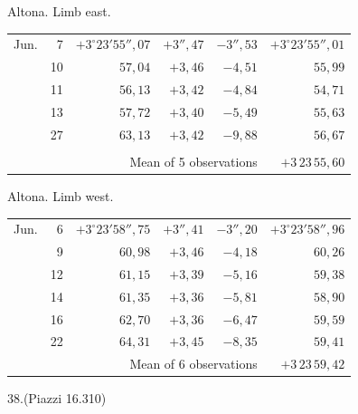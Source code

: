 \noindent\begin{minipage}[t]{.495\textwidth}\centering Altona. Limb east.\par\smallskip
{\scriptsize\setlength{\tabcolsep}{1pt}\renewcommand{\arraystretch}{1.2}\begin{tabular}{lr|r|r|r|r|}
Jun.&7&$+3^\circ23'55''{,}07$&$+3''{,}47$&$-3''{,}53$&$+3^\circ23'55''{,}01$\\
&10&$57{,}04$&$+3{,}46$&$-4{,}51$&$55{,}99$\\
&11&$56{,}13$&$+3{,}42$&$-4{,}84$&$54{,}71$\\
&13&$57{,}72$&$+3{,}40$&$-5{,}49$&$55{,}63$\\
&27&$63{,}13$&$+3{,}42$&$-9{,}88$&$56{,}67$\\
&&&&&\\
\cline{6-6}\multicolumn{5}{r}{Mean of 5 observations}&$+3\,23\,55{,}60$
\end{tabular}}\end{minipage}\hfill\begin{minipage}[t]{.495\textwidth}\centering Altona. Limb west.\par\smallskip
{\scriptsize\setlength{\tabcolsep}{1pt}\renewcommand{\arraystretch}{1.2}\begin{tabular}{lr|r|r|r|r}
Jun.&6&$+3^\circ23'58''{,}75$&$+3''{,}41$&$-3''{,}20$&$+3^\circ23'58''{,}96$\\
&9&$60{,}98$&$+3{,}46$&$-4{,}18$&$60{,}26$\\
&12&$61{,}15$&$+3{,}39$&$-5{,}16$&$59{,}38$\\
&14&$61{,}35$&$+3{,}36$&$-5{,}81$&$58{,}90$\\
&16&$62{,}70$&$+3{,}36$&$-6{,}47$&$59{,}59$\\
&22&$64{,}31$&$+3{,}45$&$-8{,}35$&$59{,}41$\\
\cline{6-6}\multicolumn{5}{r}{Mean of 6 observations}&$+3\,23\,59{,}42$
\end{tabular}}\end{minipage}
\par\vspace{4mm}
\begin{center}38.\quad (Piazzi 16.310)\end{center}

